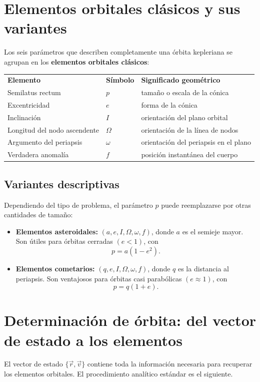 \section{Elementos orbitales clásicos y sus variantes}
Los seis parámetros que describen completamente una órbita kepleriana se agrupan en los \textbf{elementos orbitales clásicos}:
\begin{center}
\begin{tabular}{lll}
\textbf{Elemento} & \textbf{Símbolo} & \textbf{Significado geométrico} \\
Semilatus rectum & \(p\) & tamaño o escala de la cónica \\
Excentricidad & \(e\) & forma de la cónica \\
Inclinación & \(I\) & orientación del plano orbital \\
Longitud del nodo ascendente & \(\Omega\) & orientación de la línea de nodos \\
Argumento del periapsis & \(\omega\) & orientación del periapsis en el plano \\
Verdadera anomalía & \(f\) & posición instantánea del cuerpo
\end{tabular}
\end{center}

\subsection{Variantes descriptivas}
Dependiendo del tipo de problema, el parámetro \(p\) puede reemplazarse por otras cantidades de tamaño:
\begin{itemize}
    \item \textbf{Elementos asteroidales:} \((a, e, I, \Omega, \omega, f)\), donde \(a\) es el semieje mayor. Son útiles para órbitas cerradas \((e<1)\), con
\[
 p = a(1-e^2).
\]
    \item \textbf{Elementos cometarios:} \((q, e, I, \Omega, \omega, f)\), donde \(q\) es la distancia al periapsis. Son ventajosos para órbitas casi parabólicas \((e\approx 1)\), con
\[
 p = q(1+e).
\]
\end{itemize}

\section{Determinación de órbita: del vector de estado a los elementos}
El vector de estado \(\{\vec{r},\vec{v}\}\) contiene toda la información necesaria para recuperar los elementos orbitales. El procedimiento analítico estándar es el siguiente.

